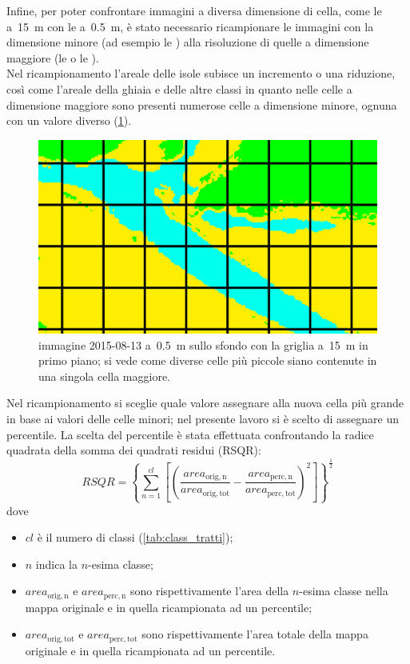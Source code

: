 Infine, per poter confrontare immagini a diversa dimensione di cella, come le \AST{} a~\SI{15}{\m} con le \Pl{} a~\SI{0.5}{\m}, è stato necessario ricampionare le immagini con la dimensione minore (ad esempio le \Pl{}) alla risoluzione di quelle a dimensione maggiore (le \AST{} o le \Se{}).
\\
Nel ricampionamento l'areale delle isole subisce un incremento o una riduzione, così come l'areale della ghiaia e delle altre classi in quanto nelle celle a dimensione maggiore sono presenti numerose celle a dimensione minore, ognuna con un valore diverso (\cref{fig:ricamp-explanation}).
%
\begin{figure}
	\centering
	\includegraphics[width=.9\textwidth]{files/ricamp_griglia.jpeg}
	\caption[celle a risoluzione diversa]{immagine \Pl{} 2015-08-13 a~\SI{0.5}{\m} sullo sfondo con la griglia a~\SI{15}{\m} in primo piano; si vede come diverse celle più piccole siano contenute in una singola cella maggiore.}
	\label{fig:ricamp-explanation}
\end{figure}
%
Nel ricampionamento si sceglie quale valore assegnare alla nuova cella più grande in base ai valori delle celle minori; nel presente lavoro si è scelto di assegnare un percentile.
La scelta del percentile è stata effettuata confrontando la radice quadrata della somma dei quadrati residui (RSQR):
%
\begin{equation}
	\label{eq:rad-som-quad-res}
	RSQR = \left\lbrace \sum_{n=1}^{cl} \left[\left( \frac{area_{\mathrm{orig,n}}}{area_{\mathrm{orig,tot}}} - \frac{area_{\mathrm{perc,n}}}{area_{\mathrm{perc,tot}}} \right)^2 \right] \right\rbrace ^ \frac{1}{2}	
\end{equation}
%
dove 
\begin{itemize}
	\item $cl$ è il numero di classi (\cref{tab:class_tratti});
	\item $n$ indica la $n$-esima classe;
	\item $area_{\mathrm{orig,n}}$ e $area_{\mathrm{perc,n}}$ sono rispettivamente l'area della $n$-esima classe nella mappa originale e in quella ricampionata ad un percentile;
	\item $area_{\mathrm{orig,tot}}$ e $area_{\mathrm{perc,tot}}$ sono rispettivamente l'area totale della mappa originale e in quella ricampionata ad un percentile. 
\end{itemize} 
